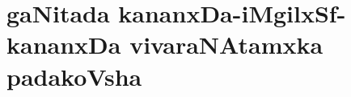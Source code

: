 \makeatletter
\def\@makechapterhead#1{%
  \vspace*{-25\p@}%
  {\parindent \z@ \raggedleft \normalfont
    \ifnum \c@secnumdepth >\m@ne
      \if@mainmatter
        \centering\Large\bfseries \vskip 2pt
        \par\nobreak
        \vskip 1\p@
      \fi
    \fi
    \interlinepenalty\@M
    \huge \bfseries #1\par\nobreak
\vskip 5pt

 \vskip 5\p@  
  }}
\makeatother

\chapter{gaNitada kananxDa-iMgilxSf-kananxDa vivaraNAtamxka padakoVsha}

